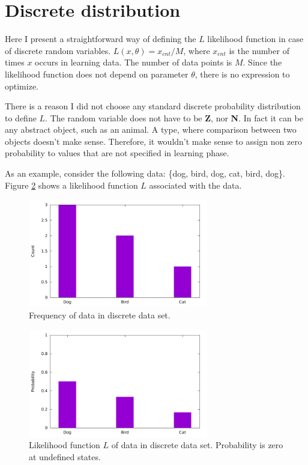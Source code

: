 \documentclass[thesis=B,english]{FITthesis}[2012/06/26]
\begin{document}
\section{Discrete distribution}

Here I present a straightforward way of defining the $L$ likelihood function in case of discrete random variables. $L(x,\theta) = x_{cnt} / M$, where $x_{cnt}$ is the number of times $x$ occurs in learning data. The number of data points is $M$. Since the likelihood function does not depend on parameter $\theta$, there is no expression to optimize.

There is a reason I did not choose any standard discrete probability distribution to define $L$. The random variable does not have to be \textbf Z, nor \textbf N. In fact it can be any abstract object, such as an animal. A type, where comparison between two objects doesn't make sense. Therefore, it wouldn't make sense to assign non zero probability to values that are not specified in learning phase.

As an example, consider the following data: \{dog, bird, dog, cat, bird, dog\}. Figure \ref{fig:discrete_mle_prob} shows a likelihood function $L$ associated with the data.

\begin{figure}
	\centering
 	\includegraphics[width=0.7\textwidth]{discrete_mle_hist}
 	\caption{Frequency of data in discrete data set.}
 	\label{fig:discrete_mle_hist}
\end{figure}

\begin{figure}
	\centering
 	\includegraphics[width=0.7\textwidth]{discrete_mle_prob}
 	\caption{Likelihood function $L$ of data in discrete data set. Probability is zero at undefined states.}
 	\label{fig:discrete_mle_prob}
\end{figure}
\end{document}
